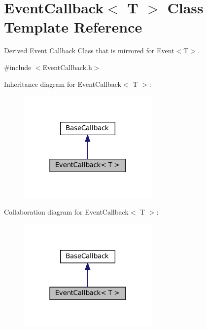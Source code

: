 \hypertarget{classEventCallback}{}\section{Event\+Callback$<$ T $>$ Class Template Reference}
\label{classEventCallback}


Derived \hyperlink{classEvent}{Event} Callback Class that is mirrored for Event$<$\+T$>$.  




{\ttfamily \#include $<$Event\+Callback.\+h$>$}



Inheritance diagram for Event\+Callback$<$ T $>$\+:\nopagebreak
\begin{figure}[H]
\begin{center}
\leavevmode
\includegraphics[width=195pt]{classEventCallback__inherit__graph}
\end{center}
\end{figure}


Collaboration diagram for Event\+Callback$<$ T $>$\+:\nopagebreak
\begin{figure}[H]
\begin{center}
\leavevmode
\includegraphics[width=195pt]{classEventCallback__coll__graph}
\end{center}
\end{figure}
